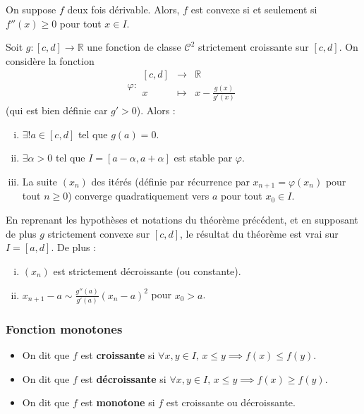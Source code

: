 	\begin{proposition}
		On suppose $f$ deux fois dérivable. Alors, $f$ est convexe si et seulement si $f''(x) \geq 0$ pour tout $x \in I$.
	\end{proposition}
	
	
	\begin{application}
		Soit $g : [c, d] \rightarrow \mathbb{R}$ une fonction de classe $\mathcal{C}^2$ strictement croissante sur $[c, d]$. On considère la fonction
		\[ \varphi :
		\begin{array}{ccc}
			[c, d] &\rightarrow& \mathbb{R} \\
			x &\mapsto& x - \frac{g(x)}{g'(x)}
		\end{array}
		\]
		(qui est bien définie car $g' > 0$). Alors :
		\begin{enumerate}[(i)]
			\item $\exists! a \in [c, d]$ tel que $g(a) = 0$.
			\item $\exists \alpha > 0$ tel que $I = [a - \alpha, a + \alpha]$ est stable par $\varphi$.
			\item La suite $(x_n)$ des itérés (définie par récurrence par $x_{n+1} = \varphi(x_n)$ pour tout $n \geq 0$) converge quadratiquement vers $a$ pour tout $x_0 \in I$.
		\end{enumerate}
	\end{application}
	
	\begin{corollary}
		En reprenant les hypothèses et notations du théorème précédent, et en supposant de plus $g$ strictement convexe sur $[c, d]$, le résultat du théorème est vrai sur $I = [a, d]$. De plus :
		\begin{enumerate}[(i)]
			\item $(x_n)$ est strictement décroissante (ou constante).
			\item $x_{n+1} - a \sim \frac{g''(a)}{g'(a)} (x_n - a)^2$ pour $x_0 > a$.
		\end{enumerate}
	\end{corollary}
	
	\subsubsection{Fonction monotones}
	
	
	\begin{definition}
		\begin{itemize}
			\item On dit que $f$ est \textbf{croissante} si $\forall x, y \in I, \, x \leq y \implies f(x) \leq f(y)$.
			\item On dit que $f$ est \textbf{décroissante} si $\forall x, y \in I, \, x \leq y \implies f(x) \geq f(y)$.
			\item On dit que $f$ est \textbf{monotone} si $f$ est croissante ou décroissante.
		\end{itemize}
	\end{definition}
	
